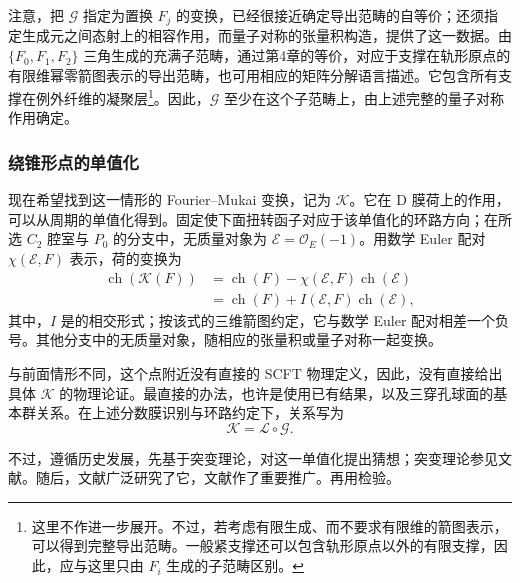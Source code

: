 注意，把 $\mathcal{G}$ 指定为置换 $F_j$ 的变换，已经很接近确定导出范畴的自等价；还须指定生成元之间态射上的相容作用，而量子对称的张量积构造，提供了这一数据。由 $\{F_0,F_1,F_2\}$ 三角生成的充满子范畴，通过第4章的等价，对应于支撑在轨形原点的有限维幂零箭图表示的导出范畴，也可用相应的矩阵分解语言描述。它包含所有支撑在例外纤维的凝聚层\footnote{这里不作进一步展开。不过，若考虑有限生成、而不要求有限维的箭图表示，可以得到完整导出范畴。一般紧支撑还可以包含轨形原点以外的有限支撑，因此，应与这里只由 $F_i$ 生成的子范畴区别。}。因此，$\mathcal{G}$ 至少在这个子范畴上，由上述完整的量子对称作用确定。

\subsubsection{绕锥形点的单值化}\label{sec:5.6.2.2}

现在希望找到这一情形的 Fourier--Mukai 变换，记为 $\mathcal{K}$。它在 D 膜荷上的作用，可以从周期的单值化得到。固定使下面扭转函子对应于该单值化的环路方向；在所选 $C_2$ 腔室与 $P_0$ 的分支中，无质量对象为 $\mathcal{E}=\mathcal{O}_E(-1)$。用数学 Euler 配对 $\chi(\mathcal{E},F)$ 表示，荷的变换为
\begin{equation}\label{eq:5.174}
\begin{aligned}
\operatorname{ch}(\mathcal{K}(F))
&=\operatorname{ch}(F)-\chi(\mathcal{E},F)\operatorname{ch}(\mathcal{E})\\
&=\operatorname{ch}(F)+I(\mathcal{E},F)\operatorname{ch}(\mathcal{E}),
\end{aligned}
\end{equation}
其中，$I$ 是的相交形式；按该式的三维箭图约定，它与数学 Euler 配对相差一个负号。其他分支中的无质量对象，随相应的张量积或量子对称一起变换。

与前面情形不同，这个点附近没有直接的 SCFT 物理定义，因此，没有直接给出具体 $\mathcal{K}$ 的物理论证。最直接的办法，也许是使用已有结果，以及三穿孔球面的基本群关系。在上述分数膜识别与环路约定下，关系写为
\begin{equation}\label{eq:5.175}
\mathcal{K}=\mathcal{L}\circ\mathcal{G}.
\end{equation}

不过，遵循历史发展，先基于突变理论，对这一单值化提出猜想；突变理论参见文献。随后，文献广泛研究了它，文献作了重要推广。再用检验。

